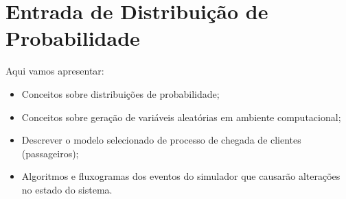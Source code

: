 \section{\label{chap:input}Entrada de Distribuição de Probabilidade}

Aqui vamos apresentar:

\begin{itemize}
\item Conceitos sobre distribuições de probabilidade;
\item Conceitos sobre geração de variáveis aleatórias em ambiente computacional;
\item Descrever o modelo selecionado de processo de chegada de clientes
(passageiros);
\item Algoritmos e fluxogramas dos eventos do simulador que causarão alterações
no estado do sistema.
\end{itemize}